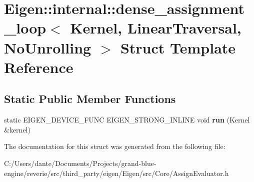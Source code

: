 \hypertarget{struct_eigen_1_1internal_1_1dense__assignment__loop_3_01_kernel_00_01_linear_traversal_00_01_no_unrolling_01_4}{}\section{Eigen\+::internal\+::dense\+\_\+assignment\+\_\+loop$<$ Kernel, Linear\+Traversal, No\+Unrolling $>$ Struct Template Reference}
\label{struct_eigen_1_1internal_1_1dense__assignment__loop_3_01_kernel_00_01_linear_traversal_00_01_no_unrolling_01_4}
\subsection*{Static Public Member Functions}
\begin{DoxyCompactItemize}
\item 
\mbox{\label{struct_eigen_1_1internal_1_1dense__assignment__loop_3_01_kernel_00_01_linear_traversal_00_01_no_unrolling_01_4_a8853bcf4c1f929744b93becdf42e1484}} 
static E\+I\+G\+E\+N\+\_\+\+D\+E\+V\+I\+C\+E\+\_\+\+F\+U\+NC E\+I\+G\+E\+N\+\_\+\+S\+T\+R\+O\+N\+G\+\_\+\+I\+N\+L\+I\+NE void {\bfseries run} (Kernel \&kernel)
\end{DoxyCompactItemize}


The documentation for this struct was generated from the following file\+:\begin{DoxyCompactItemize}
\item 
C\+:/\+Users/dante/\+Documents/\+Projects/grand-\/blue-\/engine/reverie/src/third\+\_\+party/eigen/\+Eigen/src/\+Core/Assign\+Evaluator.\+h\end{DoxyCompactItemize}
